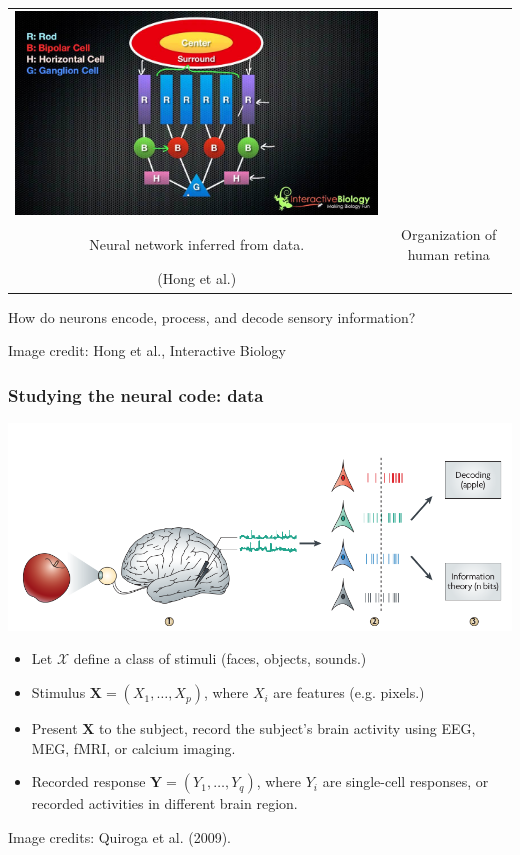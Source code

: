 \documentclass{beamer}
\newcommand{\bX}{\boldsymbol{X}}
\newcommand{\bY}{\boldsymbol{Y}}
\begin{document}
\begin{frame}
\begin{center}
\begin{tabular}{cc}
\includegraphics[scale = 0.1]{maxresdefault.jpg}\\
\small{Neural network inferred from data.} & \small{Organization of human retina}\\
\small{(Hong et al.)} & 
\end{tabular}
\end{center}
\vspace{0.3in}
How do neurons encode, process, and decode sensory information?

\tiny{Image credit: Hong et al., Interactive Biology}
\end{frame}


\begin{frame}
\frametitle{Studying the neural code: data}
\begin{center}
\includegraphics[scale = 0.2]{quiroga.png}
\end{center}
\begin{itemize}
\item  Let $\mathcal{X}$ define a class of stimuli (faces, objects, sounds.)
\item Stimulus $\bX = (X_1,\hdots, X_p)$, where $X_i$ are features (e.g. pixels.)
\item Present $\bX$ to the subject, record the subject's brain activity using EEG, MEG, fMRI, or calcium imaging.
\item Recorded response $\bY = (Y_1,\hdots, Y_q)$, where $Y_i$ are single-cell responses, or recorded activities in different brain region. 
\end{itemize}
\tiny{Image credits: Quiroga et al. (2009).}
\end{frame}
\end{document}
